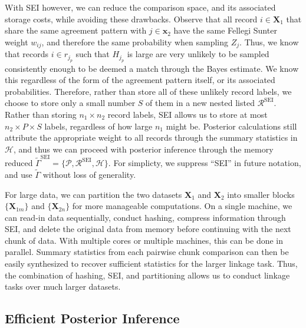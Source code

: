 \documentclass[ba]{imsart}
\begin{document}
With SEI however, we can reduce the comparison space, and its associated storage costs, while avoiding these drawbacks. Observe that all record $i \in \bm{X}_1$ that share the same agreement pattern with $j \in \bm{x}_2$ have the same Fellegi Sunter weight $w_{ij}$, and therefore the same probability when sampling \(Z_j\). Thus, we know that records $i \in r_{j_p}$  such that $H_{j_p}$ is large are very unlikely to be sampled consistently enough to be deemed a match through the Bayes estimate. We know this regardless of the form of the agreement pattern itself, or its associated probabilities. Therefore, rather than store all of these unlikely record labels, we choose to store only a small number \(S\) of them in a new nested listed $\mathcal{R}^{\text{SEI}}$. Rather than storing \(n_1 \times n_2\) record labels, SEI allows us to store at most
\(n_2 \times P \times S\) labels, regardless of how large \(n_1\) might be. Posterior calculations still attribute the appropriate weight to all records through the summary statistics in $\mathcal{H}$, and thus we can proceed with posterior inference through the memory reduced $\tilde{\Gamma}^{\text{SEI}} = \{\mathcal{P}, \mathcal{R}^{\text{SEI}}, \mathcal{H}\}$. For simplicty, we suppress ``SEI'' in future notation, and use $\tilde{\Gamma}$ without loss of generality. 


For large data, we can partition the two datasets \(\bm{X}_1\) and
\(\bm{X}_2\) into smaller blocks \(\{\bm{X}_{1m}\}\) and \(\{\bm{X}_{2n}\}\) for more
manageable computations. On a single machine, we can read-in data
sequentially, conduct hashing, compress information through SEI, and
delete the original data from memory before continuing with the next
chunk of data. With multiple cores or multiple machines, this can be
done in parallel. Summary statistics from each pairwise chunk comparison can then be easily synthesized to recover sufficient statistics for the larger linkage task.  Thus, the combination of hashing, SEI, and partitioning
allows us to conduct linkage tasks over much larger datasets.

\hypertarget{efficient-posterior}{%
	\subsection{Efficient Posterior Inference }\label{efficient-posterior}}
\end{document}
